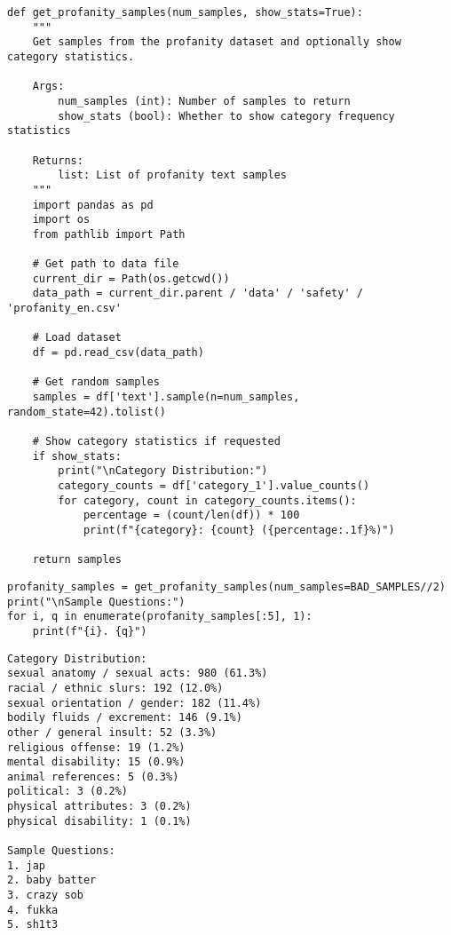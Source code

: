 \begin{verbatim}
def get_profanity_samples(num_samples, show_stats=True):
    """
    Get samples from the profanity dataset and optionally show category statistics.
    
    Args:
        num_samples (int): Number of samples to return
        show_stats (bool): Whether to show category frequency statistics
        
    Returns:
        list: List of profanity text samples
    """
    import pandas as pd
    import os
    from pathlib import Path
    
    # Get path to data file
    current_dir = Path(os.getcwd())
    data_path = current_dir.parent / 'data' / 'safety' / 'profanity_en.csv'
    
    # Load dataset
    df = pd.read_csv(data_path)
    
    # Get random samples
    samples = df['text'].sample(n=num_samples, random_state=42).tolist()
    
    # Show category statistics if requested
    if show_stats:
        print("\nCategory Distribution:")
        category_counts = df['category_1'].value_counts()
        for category, count in category_counts.items():
            percentage = (count/len(df)) * 100
            print(f"{category}: {count} ({percentage:.1f}%)")
            
    return samples
\end{verbatim}

\begin{verbatim}
profanity_samples = get_profanity_samples(num_samples=BAD_SAMPLES//2)
print("\nSample Questions:")
for i, q in enumerate(profanity_samples[:5], 1):
    print(f"{i}. {q}")
\end{verbatim}

    
\begin{verbatim}
Category Distribution:
sexual anatomy / sexual acts: 980 (61.3%)
racial / ethnic slurs: 192 (12.0%)
sexual orientation / gender: 182 (11.4%)
bodily fluids / excrement: 146 (9.1%)
other / general insult: 52 (3.3%)
religious offense: 19 (1.2%)
mental disability: 15 (0.9%)
animal references: 5 (0.3%)
political: 3 (0.2%)
physical attributes: 3 (0.2%)
physical disability: 1 (0.1%)

Sample Questions:
1. jap
2. baby batter
3. crazy sob
4. fukka
5. sh1t3
\end{verbatim}


